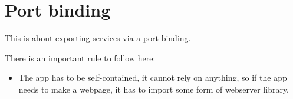 \section*{Port binding}
This is about exporting services via a port binding.

There is an important rule to follow here:
\begin{itemize}
\item The app has to be self-contained, it cannot rely on anything, so if the app needs to make a webpage, it has to import some form of webserver library.
\end{itemize}
